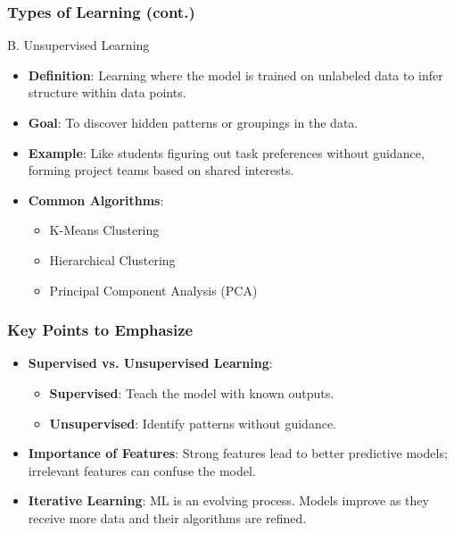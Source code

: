 \documentclass[aspectratio=169]{beamer}
\begin{document}
\begin{frame}[fragile]
    \frametitle{Types of Learning (cont.)}
    \begin{block}{B. Unsupervised Learning}
        \begin{itemize}
            \item \textbf{Definition}: Learning where the model is trained on unlabeled data to infer structure within data points.
            \item \textbf{Goal}: To discover hidden patterns or groupings in the data.
            \item \textbf{Example}: Like students figuring out task preferences without guidance, forming project teams based on shared interests.
            \item \textbf{Common Algorithms}:
                \begin{itemize}
                    \item K-Means Clustering
                    \item Hierarchical Clustering
                    \item Principal Component Analysis (PCA)
                \end{itemize}
        \end{itemize}
    \end{block}
\end{frame}

\begin{frame}[fragile]
    \frametitle{Key Points to Emphasize}
    \begin{itemize}
        \item \textbf{Supervised vs. Unsupervised Learning}:
            \begin{itemize}
                \item \textbf{Supervised}: Teach the model with known outputs.
                \item \textbf{Unsupervised}: Identify patterns without guidance.
            \end{itemize}
        \item \textbf{Importance of Features}: Strong features lead to better predictive models; irrelevant features can confuse the model.
        \item \textbf{Iterative Learning}: ML is an evolving process. Models improve as they receive more data and their algorithms are refined.
    \end{itemize}
\end{frame}
\end{document}
